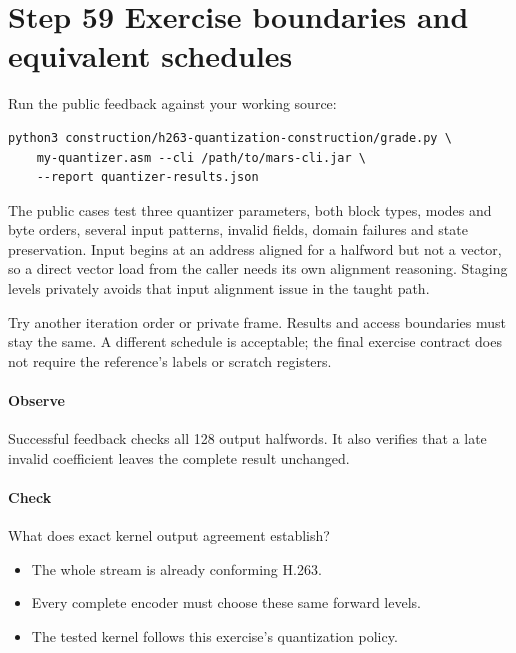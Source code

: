 \section{Step 59 Exercise boundaries and equivalent schedules}\label{h263-quant-s09}
Run the public feedback against your working source:
\begin{verbatim}
python3 construction/h263-quantization-construction/grade.py \
    my-quantizer.asm --cli /path/to/mars-cli.jar \
    --report quantizer-results.json
\end{verbatim}
The public cases test three quantizer parameters, both block types, modes and
byte orders, several input patterns, invalid fields, domain failures and state
preservation. Input begins at an address aligned for a halfword but not a vector,
so a direct vector load from the caller needs its own alignment reasoning.
Staging levels privately avoids that input alignment issue in the taught path.

Try another iteration order or private frame. Results and access boundaries
must stay the same. A different schedule is acceptable; the final exercise
contract does not require the reference's labels or scratch registers.

\paragraph{Observe} Successful feedback checks all 128 output halfwords. It
also verifies that a late invalid coefficient leaves the complete result unchanged.
\Needspace{8\baselineskip}
\paragraph{Check} What does exact kernel output agreement establish?
\begin{itemize}
  \item[A.] The whole stream is already conforming H.263.
  \item[B.] Every complete encoder must choose these same forward levels.
  \item[C.] The tested kernel follows this exercise's quantization policy.
\end{itemize}
